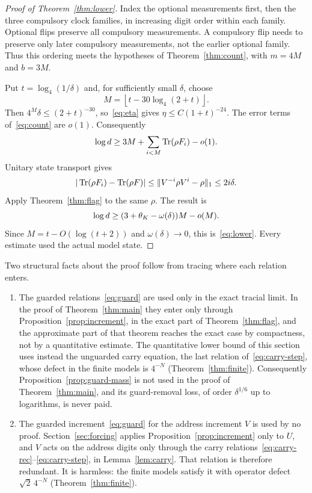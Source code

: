 \begin{proof}[Proof of Theorem~\ref{thm:lower}]
Index the optional measurements first, then the three compulsory clock families, in increasing digit order within each family. Optional flips preserve all compulsory measurements. A compulsory flip needs to preserve only later compulsory measurements, not the earlier optional family. Thus this ordering meets the hypotheses of Theorem~\ref{thm:count}, with $m=4M$ and $b=3M$.

Put $t=\log_4(1/\delta)$ and, for sufficiently small $\delta$, choose
\begin{equation}\label{eq:depth}
 M=\left\lfloor t-30\log_4(2+t)\right\rfloor.
\end{equation}
Then $4^M\delta\le(2+t)^{-30}$, so~\eqref{eq:eta} gives $\eta\le C(1+t)^{-24}$. The error terms of~\eqref{eq:count} are $o(1)$. Consequently
\[
 \log d\ge3M+\sum_{i<M}\operatorname{Tr}(\rho F_i)-o(1).
\]
Unitary state transport gives
\[
 |\operatorname{Tr}(\rho F_i)-\operatorname{Tr}(\rho F)|
 \le\lVert V^{-i}\rho V^i-\rho\rVert_1\le2i\delta.
\]
Apply Theorem~\ref{thm:flag} to the same $\rho$. The result is
\[
 \log d\ge(3+\theta_K-\omega(\delta))M-o(M).
\]
Since $M=t-O(\log(t+2))$ and $\omega(\delta)\to0$, this is~\eqref{eq:lower}. Every estimate used the actual model state.
\end{proof}

\begin{remark}\label{rem:guards}
Two structural facts about the proof follow from tracing where each relation enters.
\begin{enumerate}[label=(\alph*),leftmargin=*,itemsep=2pt]
\item The guarded relations~\eqref{eq:guard} are used only in the exact tracial limit. In the proof of Theorem~\ref{thm:main} they enter only through Proposition~\ref{prop:increment}, in the exact part of Theorem~\ref{thm:flag}, and the approximate part of that theorem reaches the exact case by compactness, not by a quantitative estimate. The quantitative lower bound of this section uses instead the unguarded carry equation, the last relation of~\eqref{eq:carry-step}, whose defect in the finite models is $4^{-N}$ (Theorem~\ref{thm:finite}). Consequently Proposition~\ref{prop:guard-mass} is not used in the proof of Theorem~\ref{thm:main}, and its guard-removal loss, of order $\delta^{1/6}$ up to logarithms, is never paid.
\item The guarded increment~\eqref{eq:guard} for the address increment $V$ is used by no proof. Section~\ref{sec:forcing} applies Proposition~\ref{prop:increment} only to $U$, and $V$ acts on the address digits only through the carry relations~\eqref{eq:carry-rec}--\eqref{eq:carry-step}, in Lemma~\ref{lem:carry}. That relation is therefore redundant. It is harmless: the finite models satisfy it with operator defect $\sqrt2\,4^{-N}$ (Theorem~\ref{thm:finite}).
\end{enumerate}
\end{remark}
